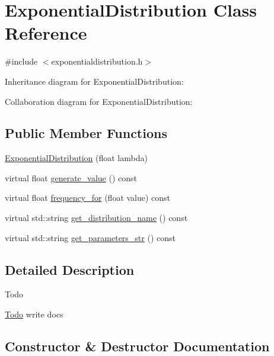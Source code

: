 \hypertarget{classExponentialDistribution}{}\section{Exponential\+Distribution Class Reference}
\label{classExponentialDistribution}


{\ttfamily \#include $<$exponentialdistribution.\+h$>$}



Inheritance diagram for Exponential\+Distribution\+:


Collaboration diagram for Exponential\+Distribution\+:
\subsection*{Public Member Functions}
\begin{DoxyCompactItemize}
\item 
\hyperlink{classExponentialDistribution_a94130671faa94ac834caa08799c9048a}{Exponential\+Distribution} (float lambda)
\item 
virtual float \hyperlink{classExponentialDistribution_aab3b68ba1f724307b74108ac96f92357}{generate\+\_\+value} () const
\item 
virtual float \hyperlink{classExponentialDistribution_a3299605c567141253eb32891f19ccef8}{frequency\+\_\+for} (float value) const
\item 
virtual std\+::string \hyperlink{classExponentialDistribution_a98ac6f2df798ae19bc371a2f071e21bb}{get\+\_\+distribution\+\_\+name} () const
\item 
virtual std\+::string \hyperlink{classExponentialDistribution_aa6f3a3208a0ec5f4b7f5fa8a36938c89}{get\+\_\+parameters\+\_\+str} () const
\end{DoxyCompactItemize}


\subsection{Detailed Description}
\begin{DoxyRefDesc}{Todo}
\item[\hyperlink{todo__todo000001}{Todo}]write docs \end{DoxyRefDesc}


\subsection{Constructor \& Destructor Documentation}
\mbox{\label{classExponentialDistribution_a94130671faa94ac834caa08799c9048a}} 
